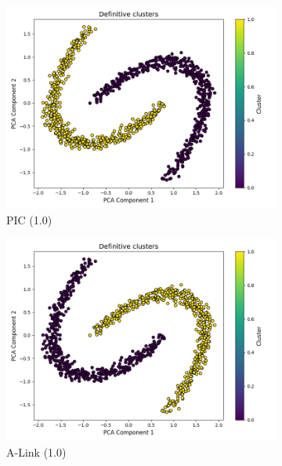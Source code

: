\documentclass[
	10pt,
	parskip=half-,	
	paper=a4,
	english
	]{scrartcl}
\begin{document}
\begin{figure}[ht]
    \begin{subfigure}[b]{0.3\textwidth}
        \includegraphics[width=\textwidth]{../data/plots/synthetic_noise_moons_moons_PIC_structural_0.png}
        \caption{PIC (1.0)}
    \end{subfigure}
    \begin{subfigure}[b]{0.3\textwidth}
        \includegraphics[width=\textwidth]{../data/plots/synthetic_noise_moons_moons_A-link_structural_0.png}
        \caption{A-Link (1.0)}
    \end{subfigure}
    \begin{subfigure}[b]{0.3\textwidth}

\end{subfigure}
\end{figure}
\end{document}
